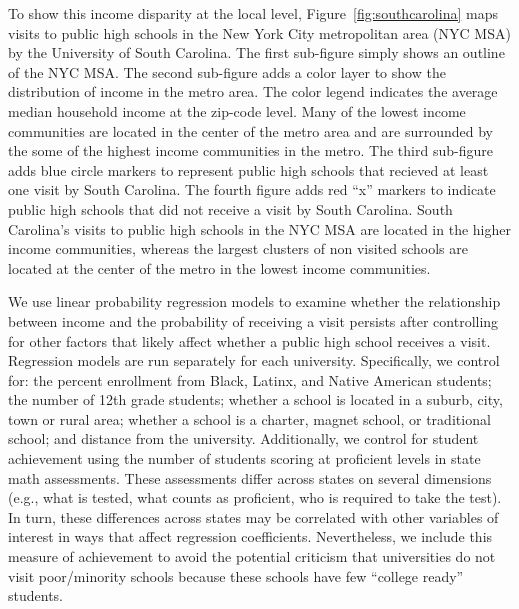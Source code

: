 \documentclass[twoside]{article}
\begin{document}
To show this income disparity at the local level, Figure~\ref{fig:southcarolina} maps visits to public high schools in the New York City metropolitan area (NYC MSA) by the University of South Carolina. The first sub-figure simply shows an outline of the NYC MSA. The second sub-figure adds a color layer to show the distribution of income in the metro area. The color legend indicates the average median household income at the zip-code level. Many of the lowest income communities are located in the center of the metro area and are surrounded by the some of the highest income communities in the metro. The third sub-figure adds blue circle markers to represent public high schools that recieved at least one visit by South Carolina. The fourth figure adds red ``x'' markers to indicate public high schools that did not receive a visit by South Carolina.  South Carolina's visits to public high schools in the NYC MSA are located in the higher income communities, whereas the largest clusters of non visited schools are located at the center of the metro in the lowest income communities.

We use linear probability regression models to examine whether the relationship between income and the probability of receiving a visit persists after controlling for other factors that likely affect whether a public high school receives a visit. Regression models are run separately for each university. Specifically, we control for: the percent enrollment from Black, Latinx, and Native American students; the number of 12th grade students; whether a school is located in a suburb, city, town or rural area; whether a school is a charter, magnet school, or traditional school; and distance from the university. Additionally, we control for student achievement using the number of students scoring at proficient levels in state math assessments. These assessments differ across states on several dimensions (e.g., what is tested, what counts as proficient, who is required to take the test). In turn, these differences across states may be correlated with other variables of interest in ways that affect regression coefficients. Nevertheless, we include this measure of achievement to avoid the potential criticism that universities do not visit poor/minority schools because these schools have few ``college ready'' students.
\end{document}
